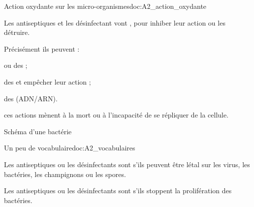 \begin{doc}{Action oxydante sur les micro-organismes}{doc:A2_action_oxydante}
  \begin{importants}  
    Les antiseptiques et les désinfectant vont , pour inhiber leur action ou les détruire.
  \end{importants}

  Précisément ils peuvent :
  \begin{listePoints}
    \item {} ou  des  ;
    \item {} des  et empêcher leur action ;
    \item {} des  (ADN/ARN).
  \end{listePoints}
  ces actions mènent à la mort ou à l'incapacité de se répliquer de la cellule.
  \begin{center}

    Schéma d'une bactérie
  \end{center}
\end{doc}





\begin{doc}{Un peu de vocabulaire}{doc:A2_vocabulaires}
  \begin{importants}
    Les antiseptiques ou les désinfectants sont  s'ils peuvent être létal sur les virus, les bactéries, les champignons ou les spores.
  \end{importants}

  \begin{importants}
    Les antiseptiques ou les désinfectants sont  s'ils stoppent la prolifération des bactéries.
  \end{importants}
\end{doc}


